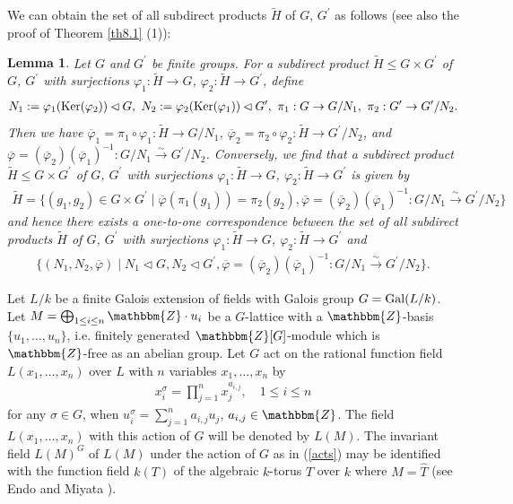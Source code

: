 \documentclass{amsart}
\theoremstyle{plain}
\newtheorem{lemma}[theorem]{Lemma}
\theoremstyle{definition}
\theoremstyle{remark}
\newcommand{\bZ}{\mathbbm{Z}}\newcommand{\bQ}{\mathbbm{Q}}
\newcounter{sub}\def\tr{\mbox{tr }}
\begin{document}
We can obtain the set of all subdirect products $\widetilde{H}$ 
of $G$, $G^\prime$ as follows (see also the proof of Theorem \ref{th8.1} (1)): 
\begin{lemma}\label{lem1.13} 
Let $G$ and $G^\prime$ be finite groups. 
For a subdirect product $\widetilde{H}\leq G\times G^\prime$ of $G$, $G^\prime$ 
with surjections $\varphi_1: \widetilde{H}\to G$, $\varphi_2: \widetilde{H}\to G^\prime$, define 
\begin{align*}
N_1:=\varphi_1({\rm Ker}(\varphi_2))\lhd G,\ 
N_2:=\varphi_2({\rm Ker}(\varphi_1))\lhd G^\prime,\ 
\pi_1:G\rightarrow G/N_1,\ 
\pi_2:G^\prime\rightarrow G^\prime/N_2.
\end{align*}
Then we have 
$\overline{\varphi}_1=\pi_1\circ\varphi_1: \widetilde{H}\rightarrow G/N_1$, 
$\overline{\varphi}_2=\pi_2\circ\varphi_2: \widetilde{H}\rightarrow G^\prime/N_2$, 
and $\overline{\varphi}=(\overline{\varphi}_2)(\overline{\varphi}_1)^{-1}:
G/N_1\xrightarrow{\sim}G^\prime/N_2$. 
%
Conversely, 
we find that a subdirect product 
$\widetilde{H}\leq G\times G^\prime$ of $G$, $G^\prime$ 
with surjections $\varphi_1: \widetilde{H}\to G$, $\varphi_2: \widetilde{H}\to G^\prime$ 
is given by 
\begin{align*}
\widetilde{H}=\{(g_1,g_2)\in G\times G^\prime\mid \overline{\varphi}(\pi_1(g_1))=\pi_2(g_2), 
\overline{\varphi}=(\overline{\varphi}_2)(\overline{\varphi}_1)^{-1}:
G/N_1\xrightarrow{\sim}G^\prime/N_2\}
\end{align*}
and hence there exists a one-to-one correspondence 
between the set of all subdirect products $\widetilde{H}$ of $G$, $G^\prime$ 
with surjections $\varphi_1: \widetilde{H}\to G$, $\varphi_2: \widetilde{H}\to G^\prime$ and 
\begin{align*}
\{(N_1,N_2,\overline{\varphi})\mid N_1\lhd G, N_2\lhd G^\prime, 
\overline{\varphi}=(\overline{\varphi}_2)(\overline{\varphi}_1)^{-1}:
G/N_1\xrightarrow{\sim}G^\prime/N_2\}. 
\end{align*}
\end{lemma}

%
Let $L/k$ be a finite Galois extension of fields with Galois group 
$G={\rm Gal}(L/k)$.  
Let $M=\bigoplus_{1\leq i\leq n}\bZ\cdot u_i$ be a $G$-lattice with 
a $\bZ$-basis $\{u_1,\ldots,u_n\}$, i.e. finitely generated $\bZ[G]$-module 
which is $\bZ$-free as an abelian group. 
Let $G$ act on the rational function field $L(x_1,\ldots,x_n)$ 
over $L$ with $n$ variables $x_1,\ldots,x_n$ by 
\begin{align}
x_i^{\sigma}=\prod_{j=1}^n x_j^{a_{i,j}},\quad 1\leq i\leq n\label{acts}
\end{align}
for any $\sigma\in G$, when $u_i^{\sigma}=\sum_{j=1}^n a_{i,j} u_j$, 
$a_{i,j}\in\bZ$. 
The field $L(x_1,\ldots,x_n)$ with this action of $G$ will be denoted by 
$L(M)$. 
The invariant field $L(M)^G$ of $L(M)$ under the action of $G$ 
as in (\ref{acts}) 
may be identified with the function field $k(T)$ 
of the algebraic $k$-torus $T$ over $k$ 
where $M=\widehat{T}$ (see Endo and Miyata \cite{EM75}).\\
\end{document}

